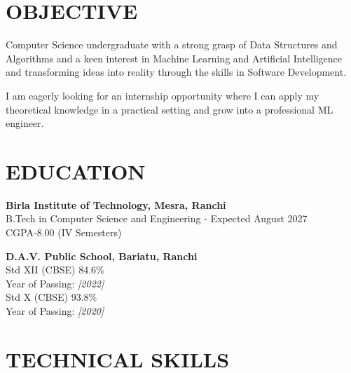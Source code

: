 \documentclass[margin, 10pt]{res} %
\begin{document}
\begin{resume}

 
\section{OBJECTIVE}  
Computer Science undergraduate with a strong grasp of Data Structures and Algorithms and a keen interest in Machine Learning and Artificial Intelligence and transforming ideas into reality through the skills in Software Development.

I am eagerly looking for an internship opportunity where I can apply my theoretical knowledge in a practical setting and grow into a professional ML engineer.


\section{EDUCATION}

\textbf{Birla Institute of Technology, Mesra, Ranchi} \\
B.Tech in Computer Science and Engineering - {Expected August 2027} \hfill \textit \\{CGPA-8.00 (IV Semesters)}

\textbf{D.A.V. Public School, Bariatu, Ranchi} \\
Std XII (CBSE) \hfill 84.6\% \\
Year of Passing: \textit{[2022]} \\

Std X (CBSE) \hfill 93.8\% \\
Year of Passing: \textit{[2020]}


 

\section{TECHNICAL SKILLS}


\end{resume}
\end{document}
